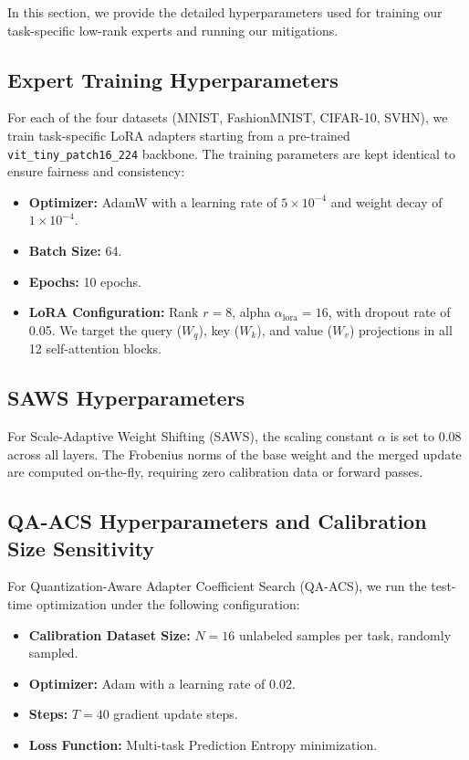 \documentclass{article}
\theoremstyle{plain}
\theoremstyle{definition}
\theoremstyle{remark}
\begin{document}
In this section, we provide the detailed hyperparameters used for training our task-specific low-rank experts and running our mitigations.

\subsection{Expert Training Hyperparameters}
For each of the four datasets (MNIST, FashionMNIST, CIFAR-10, SVHN), we train task-specific LoRA adapters starting from a pre-trained \texttt{vit\_tiny\_patch16\_224} backbone. The training parameters are kept identical to ensure fairness and consistency:
\begin{itemize}
  \item \textbf{Optimizer:} AdamW with a learning rate of $5\times 10^{-4}$ and weight decay of $1\times 10^{-4}$.
  \item \textbf{Batch Size:} 64.
  \item \textbf{Epochs:} 10 epochs.
  \item \textbf{LoRA Configuration:} Rank $r=8$, alpha $\alpha_{\text{lora}}=16$, with dropout rate of 0.05. We target the query ($W_q$), key ($W_k$), and value ($W_v$) projections in all 12 self-attention blocks.
\end{itemize}

\subsection{SAWS Hyperparameters}
For Scale-Adaptive Weight Shifting (SAWS), the scaling constant $\alpha$ is set to $0.08$ across all layers. The Frobenius norms of the base weight and the merged update are computed on-the-fly, requiring zero calibration data or forward passes.

\subsection{QA-ACS Hyperparameters and Calibration Size Sensitivity}
For Quantization-Aware Adapter Coefficient Search (QA-ACS), we run the test-time optimization under the following configuration:
\begin{itemize}
  \item \textbf{Calibration Dataset Size:} $N=16$ unlabeled samples per task, randomly sampled.
  \item \textbf{Optimizer:} Adam with a learning rate of $0.02$.
  \item \textbf{Steps:} $T=40$ gradient update steps.
  \item \textbf{Loss Function:} Multi-task Prediction Entropy minimization.
\end{itemize}
\end{document}

